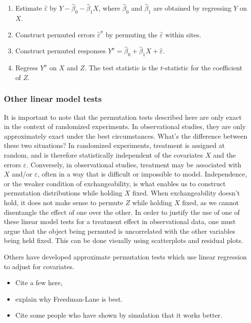 \documentclass[11pt]{article}
\newcommand{\bit}{\begin{itemize}}
\newcommand{\eit}{\end{itemize}}
\newcommand{\todo}[1]{{\color{red}{TO DO: \sc #1}}}
\begin{document}
\begin{enumerate}
\item Estimate $\hat{\varepsilon}$ by $Y - \hat{\beta}_0 - \hat{\beta}_1 X$, where $\hat{\beta}_0$ and $\hat{\beta}_1$ are obtained by regressing $Y$ on $X$.
\item Construct permuted errors $\hat{\varepsilon}^\pi$ by permuting the $\hat{\varepsilon}$ within sites.
\item Construct permuted responses $Y^\pi = \hat{\beta}_0 + \hat{\beta}_1 X + \hat{\varepsilon}$.
\item Regress $Y^\pi$ on $X$ and $Z$. The test statistic is the $t$-statistic for the coefficient of $Z$.
\end{enumerate}


\subsubsection{Other linear model tests}
It is important to note that the permutation tests described here are only exact in the context of randomized experiments.
In observational studies, they are only approximately exact under the best circumstances.
What's the difference between these two situations?
In randomized experiments, treatment is assigned at random, and is therefore statistically independent of the covariates $X$ and the errors $\varepsilon$.
Conversely, in observational studies, treatment may be associated with $X$ and/or $\varepsilon$, often in a way that is difficult or impossible to model.
Independence, or the weaker condition of exchangeability, is what enables us to construct permutation distributions while holding $X$ fixed.
When exchangeability doesn't hold, it does not make sense to permute $Z$ while holding $X$ fixed, as we cannot disentangle the effect of one over the other.
In order to justify the use of one of these linear model tests for a treatment effect in observational data, one must argue that the object being permuted is uncorrelated with the other variables being held fixed.
This can be done visually using scatterplots and residual plots.
\todo{citations!}

Others have developed approximate permutation tests which use linear regression to adjust for covariates. 
\bit
\item Cite a few here, \todo{all the Anderson papers}
\item explain why Freedman-Lane is best. 
\item Cite some people who have shown by simulation that it works better.
\eit
\end{document}
